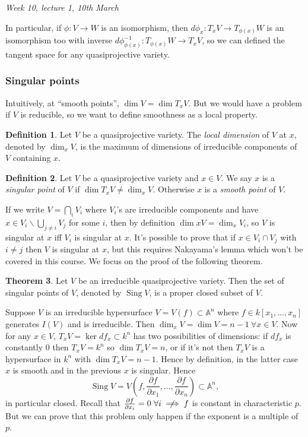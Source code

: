 \documentclass{article}
\newcommand{\A}{\mathbb{A}}
\newcommand{\Sing}{\operatorname{Sing}}
\theoremstyle{definition}
\newtheorem{defn}{Definition}[subsection]
\newtheorem{thm}[defn]{Theorem}
\begin{document}
\begin{flushright}
\textit{Week 10, lecture 1, 10th March}
\end{flushright}

In particular, if $\phi:V\rightarrow W$ is an isomorphism, then $d\phi_x:T_xV\rightarrow T_{\phi(x)}W$ is an isomorphism too with inverse $d\phi^{-1}_{\phi(x)}:T_{\phi(x)}W\rightarrow T_xV$, so we can defined the tangent space for any quasiprojective variety.

\subsubsection{Singular points}
Intuitively, at ``smooth points'', $\dim V=\dim T_xV$. But we would have a problem if $V$ is reducible, so we want to define smoothness as a local property.

\begin{defn}
Let $V$ be a quasiprojective variety. The \textit{local dimension} of $V$ at $x$, denoted by $\dim_xV$, is the maximum of dimensions of irreducible components of $V$ containing $x$.
\end{defn}

\begin{defn}
Let $V$ be a quasiprojective variety and $x\in V$. We say $x$ is a \textit{singular point} of $V$ if $\dim T_xV\neq \dim_xV$. Otherwise $x$ is a \textit{smooth point} of $V$.
\end{defn}

If we write $V=\bigcap_{i}V_i$ where $V_i$'s are irreducible components and have $x\in V_i\backslash\bigcup_{j\neq i}V_j$ for some $i$, then by definition $\dim xV=\dim_xV_i$, so $V$ is singular at $x$ iff $V_i$ is singular at $x$. It's possible to prove that if $x\in V_i\cap V_j$ with $i\neq j$ then $V$ is singular at $x$, but this requires Nakayama's lemma which won't be covered in this course. We focus on the proof of the following theorem.

\begin{thm}
\label{thm:SingVisproperclosed}
Let $V$ be an irreducible quasiprojective variety. Then the set of singular points of $V$, denoted by $\Sing V$, is a proper closed subset of $V$.
\end{thm}

Suppose $V$ is an irreducible hypersurface $V=V(f)\subset\A^n$ where $f\in k[x_1,\ldots,x_n]$ generates $I(V)$ and is irreducible. Then $\dim_xV=\dim V=n-1 \ \forall x\in V$. Now for any $x\in V$, $T_xV=\ker df_x\subset k^n$ has two possibilities of dimensions: if $df_x$ is constantly 0 then $T_xV=k^n$ so $\dim T_xV=n$, or if it's not then $T_xV$ is a hypersurface in $k^n$ with $\dim T_xV=n-1$. Hence by definition, in the latter case $x$ is smooth and in the previous $x$ is singular. Hence
\[
\Sing V=V\left(f,\frac{\partial f}{\partial x_1},\ldots,\frac{\partial f}{\partial x_n}\right)\subset\A^n,
\]
in particular closed. Recall that $\frac{\partial f}{\partial x_i}=0 \ \forall i\centernot\implies f$ is constant in characteristic $p$. But we can prove that this problem only happen if the exponent is a multiple of $p$.
\end{document}
